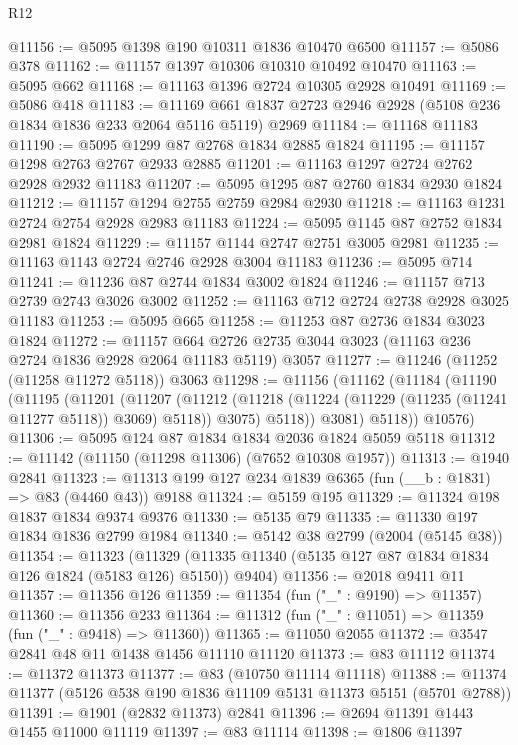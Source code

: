 \begin{lexlean}{R12}
\begin{coremodule}
@11156 := @5095 @1398 @190 @10311 @1836 @10470 @6500
@11157 := @5086 @378
@11162 := @11157 @1397 @10306 @10310 @10492 @10470
@11163 := @5095 @662
@11168 := @11163 @1396 @2724 @10305 @2928 @10491
@11169 := @5086 @418
@11183 := @11169 @661 @1837 @2723 @2946 @2928 (@5108 @236 @1834 @1836 @233 @2064 @5116 @5119) @2969
@11184 := @11168 @11183
@11190 := @5095 @1299 @87 @2768 @1834 @2885 @1824
@11195 := @11157 @1298 @2763 @2767 @2933 @2885
@11201 := @11163 @1297 @2724 @2762 @2928 @2932 @11183
@11207 := @5095 @1295 @87 @2760 @1834 @2930 @1824
@11212 := @11157 @1294 @2755 @2759 @2984 @2930
@11218 := @11163 @1231 @2724 @2754 @2928 @2983 @11183
@11224 := @5095 @1145 @87 @2752 @1834 @2981 @1824
@11229 := @11157 @1144 @2747 @2751 @3005 @2981
@11235 := @11163 @1143 @2724 @2746 @2928 @3004 @11183
@11236 := @5095 @714
@11241 := @11236 @87 @2744 @1834 @3002 @1824
@11246 := @11157 @713 @2739 @2743 @3026 @3002
@11252 := @11163 @712 @2724 @2738 @2928 @3025 @11183
@11253 := @5095 @665
@11258 := @11253 @87 @2736 @1834 @3023 @1824
@11272 := @11157
    @664
    @2726
    @2735
    @3044
    @3023
    (@11163 @236 @2724 @1836 @2928 @2064 @11183 @5119)
    @3057
@11277 := @11246 (@11252 (@11258 @11272 @5118)) @3063
@11298 := @11156
    (@11162
      (@11184
        (@11190
          (@11195
            (@11201
              (@11207
                (@11212 (@11218 (@11224 (@11229 (@11235 (@11241 @11277 @5118)) @3069) @5118)) @3075)
                @5118))
            @3081)
          @5118))
      @10576)
@11306 := @5095 @124 @87 @1834 @1834 @2036 @1824 @5059 @5118
@11312 := @11142 (@11150 (@11298 @11306) (@7652 @10308 @1957))
@11313 := @1940 @2841
@11323 := @11313 @199 @127 @234 @1839 @6365 (fun (__b : @1831) => @83 (@4460 @43)) @9188
@11324 := @5159 @195
@11329 := @11324 @198 @1837 @1834 @9374 @9376
@11330 := @5135 @79
@11335 := @11330 @197 @1834 @1836 @2799 @1984
@11340 := @5142 @38 @2799 (@2004 (@5145 @38))
@11354 := @11323
    (@11329 (@11335 @11340 (@5135 @127 @87 @1834 @1834 @126 @1824 (@5183 @126) @5150)) @9404)
@11356 := @2018 @9411 @11
@11357 := @11356 @126
@11359 := @11354 (fun ("_" : @9190) => @11357)
@11360 := @11356 @233
@11364 := @11312 (fun ("_" : @11051) => @11359 (fun ("_" : @9418) => @11360))
@11365 := @11050 @2055
@11372 := @3547 @2841 @48 @11 @1438 @1456 @11110 @11120
@11373 := @83 @11112
@11374 := @11372 @11373
@11377 := @83 (@10750 @11114 @11118)
@11388 := @11374 @11377 (@5126 @538 @190 @1836 @11109 @5131 @11373 @5151 (@5701 @2788))
@11391 := @1901 (@2832 @11373) @2841
@11396 := @2694 @11391 @1443 @1455 @11000 @11119
@11397 := @83 @11114
@11398 := @1806 @11397

\end{coremodule}
\end{lexlean}
